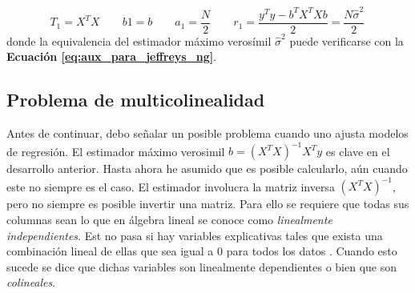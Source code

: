 \begin{equation*}
T_1 = X^TX \qquad b1 = b \qquad a_1 = \dfrac{N}{2} \qquad r_1 = \dfrac{y^Ty - b^TX^TXb}{2}=\dfrac{N\hat{\sigma}^2}{2} \,
\end{equation*}
donde la equivalencia del estimador máximo verosímil $\hat{\sigma}^2$ puede verificarse con la \textbf{Ecuación \ref{eq:aux_para_jeffreys_ng}}.\\

\subsection{Problema de multicolinealidad}

Antes de continuar, debo señalar un posible problema cuando uno ajusta modelos de regresión. El estimador máximo verosimil $b=(X^TX)^{-1}X^Ty$ es clave en el desarrollo anterior. Hasta ahora he asumido que es posible calcularlo, aún cuando este no siempre es el caso. El estimador involucra la matriz inversa $(X^TX)^{-1}$, pero no siempre es posible invertir una matriz. Para ello se requiere que todas sus columnas sean lo que en álgebra lineal se conoce como \textit{linealmente independientes}. Est no pasa si hay variables explicativas tales que exista una combinación lineal de ellas que sea igual a $0$ para todos los datos \parencite[68]{GelmanHill06}. Cuando esto sucede se dice que dichas variables son linealmente dependientes o bien que son \textit{colineales}.\\

